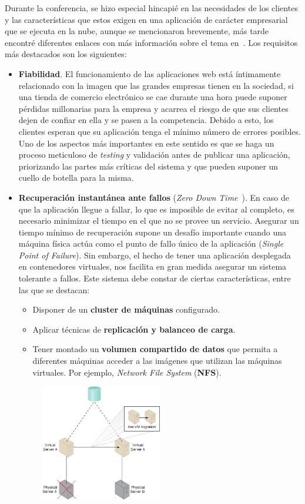 Durante la conferencia, se hizo especial hincapié en las necesidades de los clientes y las características que estos exigen en una aplicación de carácter empresarial que se ejecuta en la nube, aunque se mencionaron brevemente, más tarde encontré diferentes enlaces con más información sobre el tema en~\cite{reliab}. Los requisitos más destacados son los siguientes:

\begin{itemize}
\item \textbf{Fiabilidad}. El funcionamiento de las aplicaciones web está íntimamente relacionado con la imagen que las grandes empresas tienen en la sociedad, si una tienda de comercio electrónico se cae durante una hora puede suponer pérdidas millonarias para la empresa y acarrea el riesgo de que sus clientes dejen de confiar en ella y se pasen a la competencia. Debido a esto, los clientes esperan que su aplicación tenga el mínimo número de errores posibles. Uno de los aspectos más importantes en este sentido es que se haga un proceso meticuloso de \textit{testing} y validación antes de publicar una aplicación, priorizando las partes más críticas del sistema y que pueden suponer un cuello de botella para la misma.
\item \textbf{Recuperación instantánea ante fallos} (\emph{Zero Down Time}~\cite{zdwt}). En caso de que la aplicación llegue a fallar, lo que es imposible de evitar al completo, es necesario minimizar el tiempo en el que no se provee un servicio. Asegurar un tiempo mínimo de recuperación supone un desafío importante cuando una máquina física actúa como el punto de fallo único de la aplicación (\textit{Single Point of Failure}). Sin embargo, el hecho de tener una aplicación desplegada en contenedores virtuales, nos facilita en gran medida asegurar un sistema tolerante a fallos. Este sistema debe constar de ciertas características, entre las que se destacan:
\begin{itemize}
\item Disponer de un \textbf{cluster de máquinas} configurado.
\item Aplicar técnicas de \textbf{replicación y balanceo de carga}.
\item Tener montado un \textbf{volumen compartido de datos} que permita a diferentes máquinas acceder a las imágenes que utilizan las máquinas virtuales. Por ejemplo, \emph{Network File System} (\textbf{NFS}).
\end{itemize}
\begin{figure}
\centering
\includegraphics[width=0.5\textwidth]{spof.png}

\end{figure}
\end{itemize}
